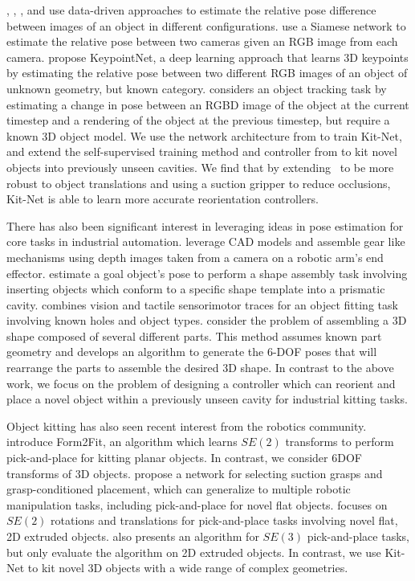 \citet{delta-pose-est}, \citet{latent-3d-keypoints}, \citet{Wen2020se3TrackNetD6}, and \citet{CASE_Orienting} use data-driven approaches to estimate the relative pose difference between images of an object in different configurations.  
\citet{delta-pose-est} use a Siamese network to estimate the relative pose between two cameras given an RGB image from each camera. \citet{latent-3d-keypoints} propose KeypointNet, a deep learning approach that learns 3D keypoints by estimating the relative pose between two different RGB images of an object of unknown geometry, but known category. 
\citet{Wen2020se3TrackNetD6} considers an object tracking task by estimating a change in pose between an RGBD image of the object at the current timestep and a rendering of the object at the previous timestep, but require a known 3D object model. We use the network architecture from \citet{Wen2020se3TrackNetD6} to train Kit-Net, and extend the self-supervised training method and controller from \citet{CASE_Orienting} to kit novel objects into previously unseen cavities. We find that by extending~\citet{CASE_Orienting} to be more robust to object translations and using a suction gripper to reduce occlusions, Kit-Net is able to learn more accurate reorientation controllers.

There has also been significant interest in leveraging ideas in pose estimation for core tasks in industrial automation.
\citet{Litvak2019LearningPE} leverage CAD models and assemble gear like mechanisms using depth images taken from a camera on a robotic arm's end effector. \citet{Stevic2020LearningTA} estimate a goal object's pose to perform a shape assembly task involving inserting objects which conform to a specific shape template into a prismatic cavity. \citet{Zachares2021InterpretingCI} combines vision and tactile
sensorimotor traces for an object fitting task involving known holes and object types.
\citet{Huang2020Generative3P} consider the problem of assembling a 3D shape composed of several different parts. This method assumes known part geometry and develops an algorithm to generate the 6-DOF poses that will rearrange the parts to assemble the desired 3D shape. In contrast to the above work, we focus on the problem of designing a controller which can reorient and place a novel object within a previously unseen cavity for industrial kitting tasks. 

Object kitting has also seen recent interest from the robotics community. \citet{Zakka2020Form2FitLS} introduce Form2Fit, an algorithm which learns $SE(2)$ transforms to perform pick-and-place for kitting planar objects. In contrast, we consider 6DOF transforms of 3D objects.
\citet{zeng2020transporter} propose a network for selecting suction grasps and grasp-conditioned placement, which can generalize to multiple robotic manipulation tasks, including pick-and-place for novel flat objects. \citeauthor{zeng2020transporter} focuses on $SE(2)$ rotations and translations for pick-and-place tasks involving novel flat, 2D extruded objects. \citeauthor{zeng2020transporter} also presents an algorithm for $SE(3)$ pick-and-place tasks, but only evaluate the algorithm on 2D extruded objects. In contrast, we use Kit-Net to kit novel 3D objects with a wide range of complex geometries.